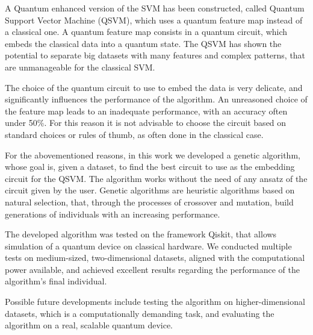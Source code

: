 \documentclass{article}
\begin{document}
A Quantum enhanced version of the SVM has been constructed, called Quantum Support Vector Machine (QSVM), which uses a quantum feature map instead of a classical one. A quantum feature map consists in a quantum circuit, which embeds the classical data into a quantum state. The QSVM has shown the potential to separate big datasets with many features and complex patterns, that are unmanageable for the classical SVM.

The choice of the quantum circuit to use to embed the data is very delicate, and significantly influences the performance of the algorithm. An unreasoned choice of the feature map leads to an inadequate performance, with an accuracy often under 50\%. For this reason it is not advisable to choose the circuit based on standard choices or rules of thumb, as often done in the classical case.  

For the abovementioned reasons, in this work we developed a genetic algorithm, whose goal is, given a dataset, to find the best circuit to use as the embedding circuit for the QSVM. The algorithm works without the need of any ansatz of the circuit given by the user. Genetic algorithms are heuristic algorithms based on natural selection, that, through the processes of crossover and mutation, build generations of individuals with an increasing performance.

The developed algorithm was tested on the framework Qiskit, that allows simulation of a quantum device on classical hardware. We conducted multiple tests on medium-sized, two-dimensional datasets, aligned with the computational power available, and achieved excellent results regarding the performance of the algorithm's final individual.

Possible future developments include testing the algorithm on higher-dimensional datasets, which is a computationally demanding task, and evaluating the algorithm on a real, scalable quantum device.
\end{document}
